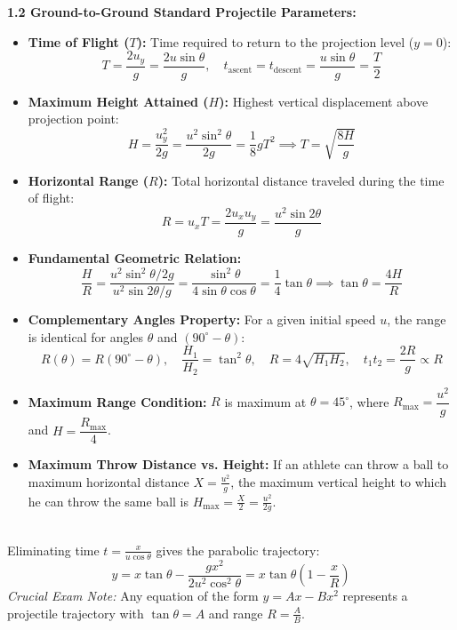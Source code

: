 \documentclass[11pt,a4paper]{article}
\begin{document}
\begin{tcolorbox}[formulacard]
  \textbf{\textcolor{primaryDark}{1.2 Ground-to-Ground Standard Projectile Parameters:}}
  \begin{itemize}[leftmargin=14pt,itemsep=2.5pt]
    \item \textbf{Time of Flight ($T$):} Time required to return to the projection level ($y = 0$):
    \[
      T = \frac{2u_y}{g} = \frac{2u\sin\theta}{g}, \quad t_{\text{ascent}} = t_{\text{descent}} = \frac{u\sin\theta}{g} = \frac{T}{2}
    \]
    \item \textbf{Maximum Height Attained ($H$):} Highest vertical displacement above projection point:
    \[
      H = \frac{u_y^2}{2g} = \frac{u^2\sin^2\theta}{2g} = \frac{1}{8}gT^2 \implies T = \sqrt{\frac{8H}{g}}
    \]
    \item \textbf{Horizontal Range ($R$):} Total horizontal distance traveled during the time of flight:
    \[
      R = u_x T = \frac{2u_x u_y}{g} = \frac{u^2\sin 2\theta}{g}
    \]
    \item \textbf{Fundamental Geometric Relation:}
    \[
      \frac{H}{R} = \frac{u^2\sin^2\theta / 2g}{u^2\sin 2\theta / g} = \frac{\sin^2\theta}{4\sin\theta\cos\theta} = \frac{1}{4}\tan\theta \implies \tan\theta = \frac{4H}{R}
    \]
    \item \textbf{Complementary Angles Property:} For a given initial speed $u$, the range is identical for angles $\theta$ and $(90^\circ - \theta)$:
    \[
      R(\theta) = R(90^\circ - \theta), \quad \frac{H_1}{H_2} = \tan^2\theta, \quad R = 4\sqrt{H_1 H_2}, \quad t_1 t_2 = \frac{2R}{g} \propto R
    \]
    \item \textbf{Maximum Range Condition:} $R$ is maximum at $\theta = 45^\circ$, where $R_{\max} = \dfrac{u^2}{g}$ and $H = \dfrac{R_{\max}}{4}$.
    \item \textbf{Maximum Throw Distance vs. Height:} If an athlete can throw a ball to maximum horizontal distance $X = \frac{u^2}{g}$, the maximum vertical height to which he can throw the same ball is $H_{\max} = \frac{X}{2} = \frac{u^2}{2g}$.
  \end{itemize}
\end{tcolorbox}

\vspace{5pt}
\noindent{\large\textbf{\textsf{\textcolor{primaryDark}{1.3 Equation of Trajectory (Path of Projectile)}}}}\\[3pt]
Eliminating time $t = \frac{x}{u\cos\theta}$ gives the parabolic trajectory:
\[
  y = x\tan\theta - \frac{gx^2}{2u^2\cos^2\theta} = x\tan\theta\left(1 - \frac{x}{R}\right)
\]
\textit{Crucial Exam Note:} Any equation of the form $y = Ax - Bx^2$ represents a projectile trajectory with $\tan\theta = A$ and range $R = \frac{A}{B}$.
\end{document}
